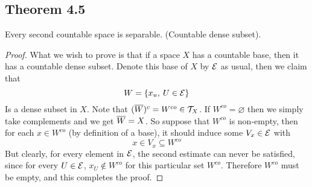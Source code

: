 \documentclass[../../main.tex]{subfiles}
\begin{document}
\subsection{Theorem 4.5}
\begin{wts}
    Every second countable space is separable. (Countable dense subset).
\end{wts}
\begin{proof}
What we wish to prove is that if a space $X$ has a countable base, then it has a countable dense subset. Denote this base of $X$ by $\mathcal{E}$ as usual, then we claim that 
\[
W = \{x_u,\:U\in\mathcal{E}\}
\]
Is a dense subset in $X$. Note that $(\overline{W})^c= W^{co}\in\mathcal{T}_X$. If $W^{co}=\varnothing$ then we simply take complements and we get $\overline{W}=X$. So suppose that $W^{co}$ is non-empty, then for each $x\in W^{co}$ (by definition of a base), it should induce some $V_x\in\mathcal{E}$ with
\[
x\in V_x\subseteq W^{co}
\]
But clearly, for every element in $\mathcal{E}$, the second estimate can never be satisfied, since for every $U\in\mathcal{E}$, $x_U\notin W^{co}$ for this particular set $W^{co}$. Therefore $W^{co}$ must be empty, and this completes the proof.
\end{proof}
\end{document}
